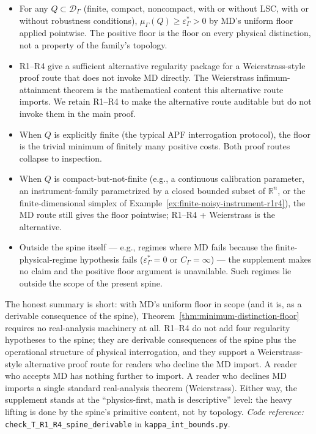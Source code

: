 \documentclass[11pt]{article}
\newcommand{\coderef}[2]{\smallskip\noindent\textit{Code reference:} \texttt{#1} in \texttt{#2}.}
\begin{document}
\begin{itemize}[leftmargin=2em,topsep=4pt,itemsep=4pt]
\item For any $Q\subset\mathcal D_\Gamma$ (finite, compact, noncompact, with or without LSC, with or without robustness conditions), $\mu_\Gamma(Q) \ge \varepsilon^*_\Gamma > 0$ by MD's uniform floor applied pointwise.  The positive floor is the floor on every physical distinction, not a property of the family's topology.
\item R1--R4 give a sufficient alternative regularity package for a Weierstrass-style proof route that does not invoke MD directly.  The Weierstrass infimum-attainment theorem is the mathematical content this alternative route imports.  We retain R1--R4 to make the alternative route auditable but do not invoke them in the main proof.
\item When $Q$ is explicitly finite (the typical APF interrogation protocol), the floor is the trivial minimum of finitely many positive costs.  Both proof routes collapse to inspection.
\item When $Q$ is compact-but-not-finite (e.g., a continuous calibration parameter, an instrument-family parametrized by a closed bounded subset of $\mathbb R^n$, or the finite-dimensional simplex of Example~\ref{ex:finite-noisy-instrument-r1r4}), the MD route still gives the floor pointwise; R1--R4 + Weierstrass is the alternative.
\item Outside the spine itself --- e.g., regimes where MD fails because the finite-physical-regime hypothesis fails ($\varepsilon^*_\Gamma = 0$ or $C_\Gamma = \infty$) --- the supplement makes no claim and the positive floor argument is unavailable.  Such regimes lie outside the scope of the present spine.
\end{itemize}

The honest summary is short: with MD's uniform floor in scope (and it is, as a derivable consequence of the spine), Theorem~\ref{thm:minimum-distinction-floor} requires no real-analysis machinery at all.  R1--R4 do not add four regularity hypotheses to the spine; they are derivable consequences of the spine plus the operational structure of physical interrogation, and they support a Weierstrass-style alternative proof route for readers who decline the MD import.  A reader who accepts MD has nothing further to import.  A reader who declines MD imports a single standard real-analysis theorem (Weierstrass).  Either way, the supplement stands at the ``physics-first, math is descriptive'' level: the heavy lifting is done by the spine's primitive content, not by topology.
\coderef{check\_T\_R1\_R4\_spine\_derivable}{kappa\_int\_bounds.py}
\end{document}

